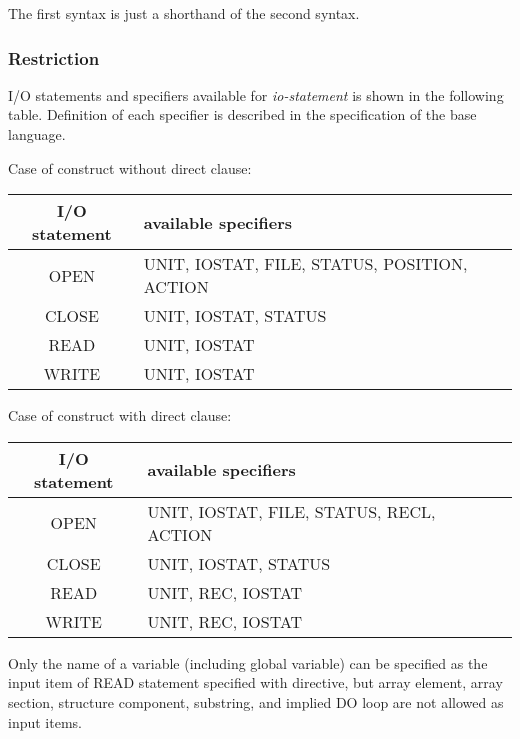    The first syntax is just a shorthand of the second syntax.

   \subsubsection*{Restriction}

   I/O statements and specifiers available for {\it io-statement} is
   shown in the following table.
   Definition of each specifier is described in the specification of the base language. 

   Case of \gio construct without direct clause:
   \begin{table}[h]
   \begin{center}
    \label{tb:globalstatement}
    \begin{tabular}{|c||l|}
      \hline
     I/O statement & available specifiers \\ \hline \hline
     OPEN & UNIT, IOSTAT, FILE, STATUS, POSITION, ACTION \\ \hline
     CLOSE & UNIT, IOSTAT, STATUS \\ \hline
     READ & UNIT, IOSTAT \\ \hline
     WRITE & UNIT, IOSTAT \\ \hline
    \end{tabular}
   \end{center}
   \end{table}

   Case of \gio construct with direct clause:
   \begin{table}[h]
   \begin{center}
    \label{tb:globalstatement}
    \begin{tabular}{|c||l|}
      \hline
     I/O statement & available specifiers \\ \hline \hline
     OPEN & UNIT, IOSTAT, FILE, STATUS, RECL, ACTION \\ \hline
     CLOSE & UNIT, IOSTAT, STATUS \\ \hline
     READ & UNIT, REC, IOSTAT \\ \hline
     WRITE & UNIT, REC, IOSTAT \\ \hline
    \end{tabular}
   \end{center}
   \end{table}

   Only the name of a variable (including global variable) can be specified 
   as the input item of READ statement specified with \gio directive,
   but array element, array section,
   structure component, substring, and implied DO loop are not allowed as input items.

